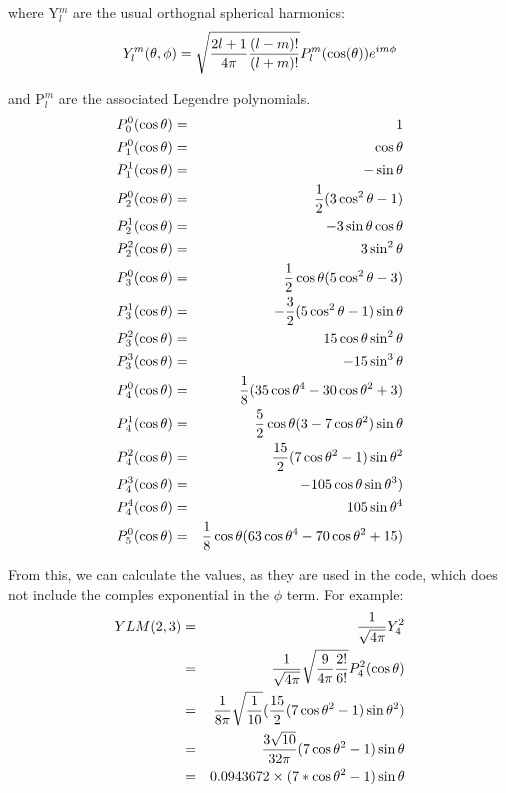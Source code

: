 where Y$_l^m$ are the usual orthognal spherical harmonics:\\

\begin{equation}
Y_l^m(\theta, \phi) = \sqrt{ {2 l + 1 \over 4 \pi} {(l - m)! \over (l + m)!}}
P_l^m(\cos(\theta)) e^{i m \phi}
\end{equation}

and P$_l^m$ are the associated Legendre polynomials.\\

\begin{eqnarray}
P_0^0(\cos \theta)	&=&	1\nonumber\\
P_1^0(\cos \theta)	&=&	\cos \theta\nonumber\\
P_1^1(\cos \theta)	&=&	-\sin \theta\nonumber\\
P_2^0(\cos \theta)	&=&	{1 \over 2} (3 \cos^2 \theta - 1)\nonumber\\
P_2^1(\cos \theta)	&=&	-3\sin \theta\cos \theta\nonumber\\
P_2^2(\cos \theta)	&=&	3 \sin^2 \theta\nonumber\\
P_3^0(\cos \theta)	&=&	{1 \over 2}\cos \theta(5 \cos^2 \theta - 3)\nonumber\\
P_3^1(\cos \theta)	&=&	-{3 \over2} (5 \cos^2 \theta - 1)\sin \theta\nonumber\\
P_3^2(\cos \theta)	&=&	15\cos \theta \sin^2 \theta\nonumber\\
P_3^3(\cos \theta)	&=&	-15 \sin^3 \theta\nonumber\\
P_4^0(\cos\theta)	&=&	{1 \over 8}(35\cos\theta^4-30\cos\theta^2+3)\nonumber\\
P_4^1(\cos\theta)	&=&	{5 \over 2} \cos\theta(3-7\cos\theta^2)\sin\theta\nonumber\\
P_4^2(\cos\theta)	&=&	{15 \over 2} (7\cos\theta^2-1)\sin\theta^2\nonumber\\
P_4^3(\cos\theta)	&=&	-105 \cos\theta \sin\theta^3)\nonumber\\
P_4^4(\cos\theta)	&=&	105 \sin\theta^4\nonumber\\
P_5^0(\cos\theta)	&=&	{1 \over 8} \cos\theta(63\cos\theta^4-70\cos\theta^2+15)\nonumber\\
\end{eqnarray}

From this, we can calculate the values, as they are used in the code, which
does not include the comples exponential in the $\phi$ term. For example:\\

\begin{eqnarray}
YLM(2,3)&=&{1 \over \sqrt{4 \pi}} Y_4^2\nonumber\\
        &=&{1 \over \sqrt{4 \pi}}
	  \sqrt{{9 \over 4 \pi} {2! \over 6!}}
	  P_4^2(\cos\theta)\nonumber\\
	&=&{1 \over 8 \pi} \sqrt{1 \over 10}
	   ({15 \over 2} (7\cos\theta^2-1) \sin\theta^2)\nonumber\\
	&=&{3 \sqrt{10} \over 32 \pi} (7 \cos\theta^2 - 1) \sin\theta\nonumber\\
	&=&0.0943672 \times (7 * \cos\theta^2 -1) \sin\theta\nonumber\\
\end{eqnarray}

